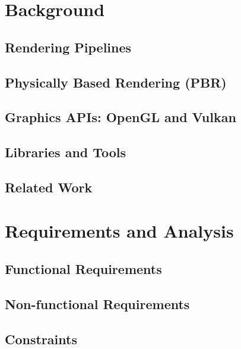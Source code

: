 \documentclass[12pt,a4paper,openright,twoside]{book}
\begin{document}
\chapter{Background}
\label{chap:background}

\section{Rendering Pipelines}

\section{Physically Based Rendering (PBR)}

\section{Graphics APIs: OpenGL and Vulkan}

\section{Libraries and Tools}

\section{Related Work}

\chapter{Requirements and Analysis}
\label{chap:analysis}

\section{Functional Requirements}

\section{Non-functional Requirements}

\section{Constraints}
\end{document}
